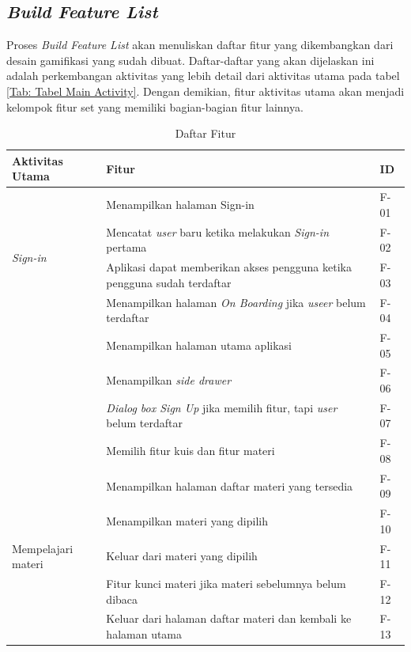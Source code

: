 \subsection{\textit{Build Feature List}}
Proses \textit{Build Feature List} akan menuliskan daftar fitur yang dikembangkan dari desain gamifikasi yang sudah dibuat.
Daftar-daftar yang akan dijelaskan ini adalah perkembangan aktivitas yang lebih detail dari aktivitas utama pada tabel \ref*{Tab: Tabel Main Activity}.
Dengan demikian, fitur aktivitas utama akan menjadi kelompok fitur set yang memiliki bagian-bagian fitur lainnya.
\begin{table}[H]
	\centering
	\caption{Daftar Fitur}
	\begin{tabular}{|m{3cm}|p{}|m{1.5cm}|}
		\hline
		\centering\textbf{Aktivitas Utama} & \centering\textbf{Fitur} & \multicolumn{1}{m{1.5cm}|}{\centering \textbf{ID}} \\
		\hline
		\multirow{4}{2.5cm}{\textit{Sign-in}} &Menampilkan halaman Sign-in & F-01 \\
		\cline{2-3}
		 &Mencatat \textit{user} baru ketika melakukan \textit{Sign-in} pertama & F-02 \\
		\cline{2-3}
		 &Aplikasi dapat memberikan akses pengguna ketika pengguna sudah terdaftar& F-03 \\
		\hline
		\multirow{5}{2.5cm}{Melihat \textit{dashboard} halaman utama} &Menampilkan halaman \textit{On Boarding} jika \textit{useer} belum terdaftar & F-04 \\
		\cline{2-3}
		&Menampilkan halaman utama aplikasi& F-05 \\
		\cline{2-3}
		&Menampilkan \textit{side drawer}& F-06 \\
		\cline{2-3}
		&\textit{Dialog box Sign Up} jika memilih fitur, tapi \textit{user} belum terdaftar& F-07 \\
		\cline{2-3}
		&Memilih fitur kuis dan fitur materi& F-08 \\
		\hline
		\multirow{6}{2.5cm}{Mempelajari materi} &Menampilkan halaman daftar materi yang tersedia& F-09 \\
		\cline{2-3}
		&Menampilkan materi yang dipilih & F-10 \\
		\cline{2-3}
		&Keluar dari materi yang dipilih& F-11 \\
		\cline{2-3}
		&Fitur kunci materi jika materi sebelumnya belum dibaca& F-12 \\
		\cline{2-3}
		&Keluar dari halaman daftar materi dan kembali ke halaman utama& F-13 \\

\end{tabular}
\end{table}
